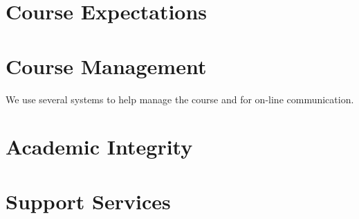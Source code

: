 \documentclass[11pt]{article}
\begin{document}
\section{Course Expectations}



\section{Course Management}

We use several systems to help manage the course
and for on-line communication.





\section{Academic Integrity}



\section{Support Services}



\lastupdated
\end{document}
